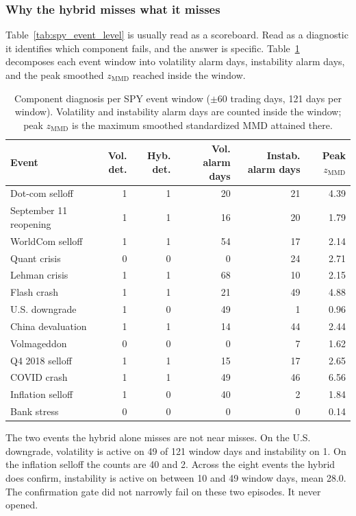 \documentclass[pdflatex,sn-mathphys-num,iicol]{sn-jnl}
\begin{document}
\subsubsection{Why the hybrid misses what it misses}
\label{sec:mechanism}
Table~\ref{tab:spy_event_level} is usually read as a scoreboard. Read as a diagnostic it identifies which component fails, and the answer is specific. Table~\ref{tab:mechanism} decomposes each event window into volatility alarm days, instability alarm days, and the peak smoothed $z_{\mathrm{MMD}}$ reached inside the window.

\begin{table}[t]
\centering
\caption{Component diagnosis per SPY event window ($\pm60$ trading days, 121 days per window). Volatility and instability alarm days are counted inside the window; peak $z_{\mathrm{MMD}}$ is the maximum smoothed standardized MMD attained there.}
\label{tab:mechanism}
\scriptsize
\begin{tabular}{lrrrrr}
\toprule
Event & Vol. det. & Hyb. det. & Vol. alarm days & Instab. alarm days & Peak $z_{\mathrm{MMD}}$\\
\midrule
Dot-com selloff & 1 & 1 & 20 & 21 & 4.39\\
September 11 reopening & 1 & 1 & 16 & 20 & 1.79\\
WorldCom selloff & 1 & 1 & 54 & 17 & 2.14\\
Quant crisis & 0 & 0 & 0 & 24 & 2.71\\
Lehman crisis & 1 & 1 & 68 & 10 & 2.15\\
Flash crash & 1 & 1 & 21 & 49 & 4.88\\
U.S. downgrade & 1 & 0 & 49 & 1 & 0.96\\
China devaluation & 1 & 1 & 14 & 44 & 2.44\\
Volmageddon & 0 & 0 & 0 & 7 & 1.62\\
Q4 2018 selloff & 1 & 1 & 15 & 17 & 2.65\\
COVID crash & 1 & 1 & 49 & 46 & 6.56\\
Inflation selloff & 1 & 0 & 40 & 2 & 1.84\\
Bank stress & 0 & 0 & 0 & 0 & 0.14\\
\bottomrule
\end{tabular}
\end{table}

The two events the hybrid alone misses are not near misses. On the U.S. downgrade, volatility is active on 49 of 121 window days and instability on 1. On the inflation selloff the counts are 40 and 2. Across the eight events the hybrid does confirm, instability is active on between 10 and 49 window days, mean 28.0. The confirmation gate did not narrowly fail on these two episodes. It never opened.
\end{document}
